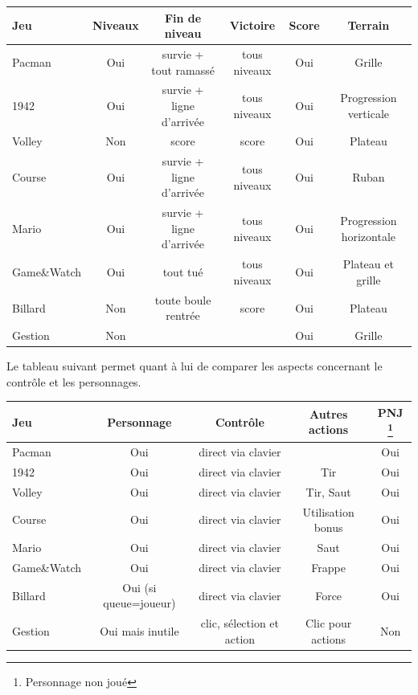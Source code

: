 \begin{tabular}{|l|| c|c|c|c|c|}
\hline
 Jeu &  Niveaux & Fin de niveau & Victoire & Score & Terrain \\
\hline
 Pacman & Oui & survie + tout ramassé & tous niveaux & Oui & Grille \\
\hline
 1942 & Oui & survie + ligne d'arrivée & tous niveaux & Oui & Progression verticale \\
\hline
 Volley &  Non & score & score & Oui & Plateau \\
\hline
 Course & Oui & survie + ligne d'arrivée & tous niveaux & Oui & Ruban \\
\hline
 Mario & Oui & survie + ligne d'arrivée & tous niveaux & Oui & Progression horizontale\\
\hline
 Game\&Watch & Oui & tout tué & tous niveaux & Oui  & Plateau et grille\\
\hline
 Billard & Non & toute boule rentrée & score & Oui & Plateau \\
\hline
 Gestion & Non & & & Oui & Grille\\
\hline
\end{tabular}

\vspace{0.5cm}

Le tableau suivant permet quant à lui de comparer les aspects concernant le contrôle et les personnages.

\vspace{0.5cm}

\begin{tabular}{|l|| c|c|c|c|}
\hline
 Jeu & Personnage & Contrôle & Autres actions & PNJ \footnote{Personnage non joué} \\
\hline
 Pacman &  Oui & direct via clavier & &  Oui \\
\hline
 1942 & Oui & direct via clavier & Tir & Oui  \\
\hline
 Volley & Oui & direct via clavier  & Tir, Saut & Oui \\
\hline
 Course & Oui & direct via clavier & Utilisation bonus & Oui \\
\hline
 Mario & Oui & direct via clavier &  Saut & Oui \\
\hline
 Game\&Watch & Oui & direct via clavier & Frappe & Oui  \\
\hline 
 Billard &  Oui {\small (si queue=joueur)} & direct via clavier & Force & Oui  \\
\hline
 Gestion &  Oui mais inutile & clic, sélection et action & Clic pour actions & Non \\
\hline
\end{tabular}

